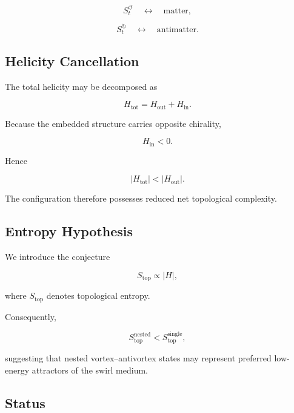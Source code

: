        \[
            S_t^{\circlearrowleft}
            \quad\leftrightarrow\quad
            \text{matter},
        \]
        
        \[
            S_t^{\circlearrowright}
            \quad\leftrightarrow\quad
            \text{antimatter}.
        \]
    
    \subsection{Helicity Cancellation}
        
        The total helicity may be decomposed as
        
        \[
            H_{\mathrm{tot}}
            =
            H_{\mathrm{out}}
            +
            H_{\mathrm{in}}.
        \]
        
        Because the embedded structure carries opposite chirality,
        
        \[
            H_{\mathrm{in}}<0.
        \]
        
        Hence
        
        \[
            |H_{\mathrm{tot}}|
            <
            |H_{\mathrm{out}}|.
        \]
        
        The configuration therefore possesses reduced net topological complexity.
    
    \subsection{Entropy Hypothesis}
        
        We introduce the conjecture
        
        \[
            S_{\mathrm{top}}
            \propto
            |H|,
        \]
        
        where $S_{\mathrm{top}}$ denotes topological entropy.
        
        Consequently,
        
        \[
            S_{\mathrm{top}}^{\mathrm{nested}}
            <
            S_{\mathrm{top}}^{\mathrm{single}},
        \]
        
        suggesting that nested vortex--antivortex states may represent preferred
        low-energy attractors of the swirl medium.
    
    \subsection{Status}
        
